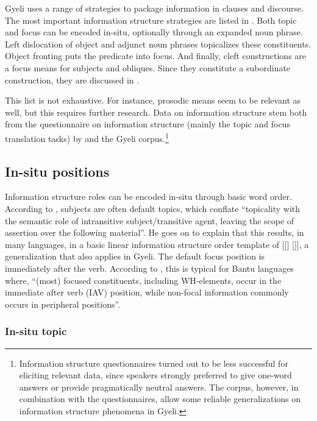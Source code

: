 Gyeli uses a range of strategies to package information in clauses and discourse. The most important information structure strategies are listed in . Both topic and{\pagebreak} focus can be encoded in-situ, optionally through an expanded noun phrase. Left dislocation of object and adjunct noun phrases topicalizes these constituents. Object fronting puts the predicate into focus. And finally, cleft constructions are a focus means for subjects and obliques. Since they constitute a subordinate construction, they are discussed in .






\noindent This list is not exhaustive. For instance, prosodic means seem to be relevant as well, but this requires further research.  Data on information structure stem both from the questionnaire on information structure (mainly the topic and focus translation tasks) by \citet{skopeteas2006} and the Gyeli corpus.\footnote{Information structure questionnaires turned out to be less successful for eliciting relevant data, since speakers strongly preferred to give one-word answers or provide pragmatically neutral answers. The corpus, however, in combination with the questionnaires, allow some reliable generalizations on information structure phenomena in Gyeli.} 



 


\subsection{In-situ positions}

Information structure roles can be encoded in-situ through basic word order. According to \citet[159]{guldemann2015}, subjects are often default topics, which conflate  ``topicality with the semantic role of intransitive subject/transitive agent, leaving the scope of assertion over the following material''.  He goes on to explain that this results, in many languages, in a basic linear information structure order template of [[{\TOP}] [{\FOC}]], a generalization that also applies in Gyeli. The default focus position is immediately after the verb. According to \citet[793]{downing2014}, this is typical for Bantu languages where, ``(most) focused constituents, including WH-elements, occur in the immediate after verb (IAV) position, while non-focal information commonly occurs in peripheral positions''. 


\subsubsection{In-situ topic}
\label{sec:insituTop}


